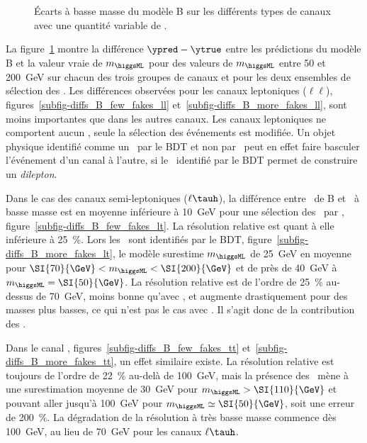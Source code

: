 \begin{figure}[p]
\caption[Effet des \ftauhs\ sur l'écart des prédictions du modèle B à la valeur vraie.]{Écarts à basse masse du modèle B sur les différents types de canaux avec une quantité variable de \ftauhs.}
\label{fig-diffs_fakes_B_tt-lt-ll}
\end{figure}
\par
La figure~\ref{fig-diffs_fakes_B_tt-lt-ll} montre la différence $\ypred-\ytrue$ entre les prédictions du modèle B et la valeur vraie de $m_{\higgsML}$ pour des valeurs de $m_{\higgsML}$ entre \num{50} et \SI{200}{\GeV} sur chacun des trois groupes de canaux et pour les deux ensembles de sélection des \tauh.
Les différences observées pour les canaux leptoniques ($\ell\ell$),
figures~\ref{subfig-diffs_B_few_fakes_ll} et~\ref{subfig-diffs_B_more_fakes_ll},
sont moins importantes que dans les autres canaux.
Les canaux leptoniques ne comportent aucun \tauh, seule la sélection des événements est modifiée.
Un objet physique identifié comme un \tauh\ par le BDT et non par \DEEPTAU\ peut en effet faire basculer l'événement d'un canal à l'autre, si le \tauh\ identifié par le BDT permet de construire un \emph{dilepton}.
\par
Dans le cas des canaux semi-leptoniques ($\ell\tauh$),
la différence entre \ypred\ de B et \ytrue\ à basse masse est en moyenne inférieure à \SI{10}{\GeV}
pour une sélection des \tauh\ par \DEEPTAU, figure~\ref{subfig-diffs_B_few_fakes_lt}.
La résolution relative est quant à elle inférieure à \SI{25}{\%}.
Lors les \tauh\ sont identifiés par le BDT,
figure~\ref{subfig-diffs_B_more_fakes_lt},
le modèle surestime $m_{\higgsML}$ de \SI{25}{\GeV} en moyenne pour $\SI{70}{\GeV} < m_{\higgsML} < \SI{200}{\GeV}$
et de près de \SI{40}{\GeV} à $m_{\higgsML}=\SI{50}{\GeV}$.
La résolution relative est de l'ordre de \SI{25}{\%} au-dessus de \SI{70}{\GeV},
moins bonne qu'avec \DEEPTAU,
et augmente drastiquement pour des masses plus basses, ce qui n'est pas le cas avec \DEEPTAU.
Il s'agit donc de la contribution des \ftauhs.
\par
Dans le canal \tauh\tauh,
figures~\ref{subfig-diffs_B_few_fakes_tt} et~\ref{subfig-diffs_B_more_fakes_tt},
un effet similaire existe.
La résolution relative est toujours de l'ordre de \SI{22}{\%} au-delà de \SI{100}{\GeV},
mais la présence des \ftauhs\ mène à une surestimation moyenne de \SI{30}{\GeV} pour $m_{\higgsML}>\SI{110}{\GeV}$
et pouvant aller jusqu'à \SI{100}{\GeV} pour $m_{\higgsML}\simeq\SI{50}{\GeV}$, soit une erreur de \SI{200}{\%}.
La dégradation de la résolution à très basse masse commence dès \SI{100}{\GeV}, au lieu de \SI{70}{\GeV} pour les canaux $\ell\tauh$.
